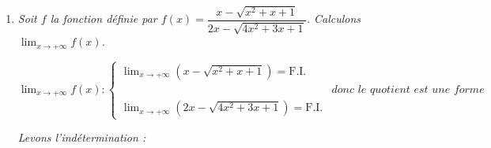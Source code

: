 \documentclass[12pt,a4paper]{article}
\begin{document}
\begin{enumerate}
     
    
    \item \textit{Soit $f$ la fonction définie par $f(x) = \dfrac{x - \sqrt{x^2 + x + 1}}{2x - \sqrt{4x^2 + 3x + 1}}$. Calculons $\displaystyle \lim_{x \to +\infty} f(x)$.}
    
    \vspace{0.1cm}
    
    $
    \displaystyle \lim_{x \to +\infty} f(x):
    \begin{cases}
    \displaystyle \lim_{x \to +\infty} (x - \sqrt{x^2 + x + 1}) = \text{F.I.}\\[3mm]
    &\textit{donc le quotient est une forme indéterminée.}\\
    \displaystyle \lim_{x \to +\infty} (2x - \sqrt{4x^2 + 3x + 1}) = \text{F.I.}
    \end{cases}
    $

    \textit{Levons l'indétermination :}
    

\end{enumerate}
\end{document}
